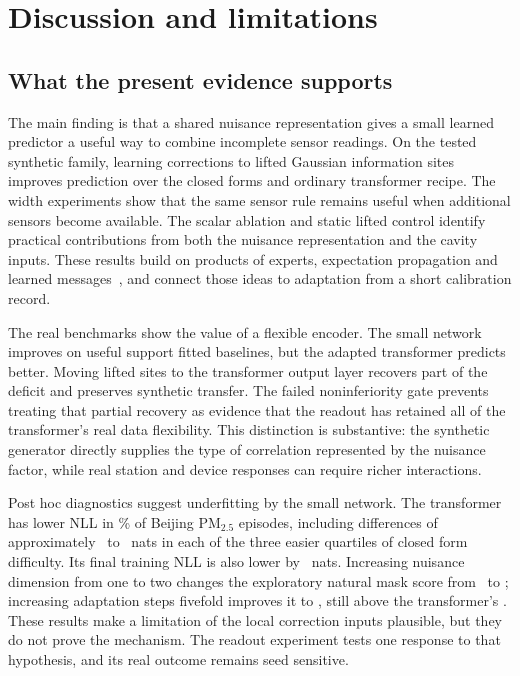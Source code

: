 \section{Discussion and limitations}
\label{sec:discussion}

\subsection{What the present evidence supports}

The main finding is that a shared nuisance representation gives a small learned predictor a useful way to combine incomplete sensor readings. On the tested synthetic family, learning corrections to lifted Gaussian information sites improves prediction over the closed forms and ordinary transformer recipe. The width experiments show that the same sensor rule remains useful when additional sensors become available. The scalar ablation and static lifted control identify practical contributions from both the nuisance representation and the cavity inputs. These results build on products of experts, expectation propagation and learned messages~\citep{hinton2002poe,minka2001ep,heess2013learning,eslami2014just,jitkrittum2015kernel}, and connect those ideas to adaptation from a short calibration record.

The real benchmarks show the value of a flexible encoder. The small network improves on useful support fitted baselines, but the adapted transformer predicts better. Moving lifted sites to the transformer output layer recovers part of the deficit and preserves synthetic transfer. The failed noninferiority gate prevents treating that partial recovery as evidence that the readout has retained all of the transformer's real data flexibility. This distinction is substantive: the synthetic generator directly supplies the type of correlation represented by the nuisance factor, while real station and device responses can require richer interactions.



Post hoc diagnostics suggest underfitting by the small network. The transformer has lower NLL in \FTbeijingpfnbetterpct\% of Beijing PM$_{2.5}$ episodes, including differences of approximately \FTbeijinggapqQOne\ to \FTbeijinggapqQTwo\ nats in each of the three easier quartiles of closed form difficulty. Its final training NLL is also lower by \FTbeijingtraingap\ nats. Increasing nuisance dimension from one to two changes the exploratory natural mask score from \Xpliftone\ to \Xplifttwo; increasing adaptation steps fivefold improves it to \Xpliftlong, still above the transformer's \RbeijingeZerovalftpfn. These results make a limitation of the local correction inputs plausible, but they do not prove the mechanism. The readout experiment tests one response to that hypothesis, and its real outcome remains seed sensitive.

